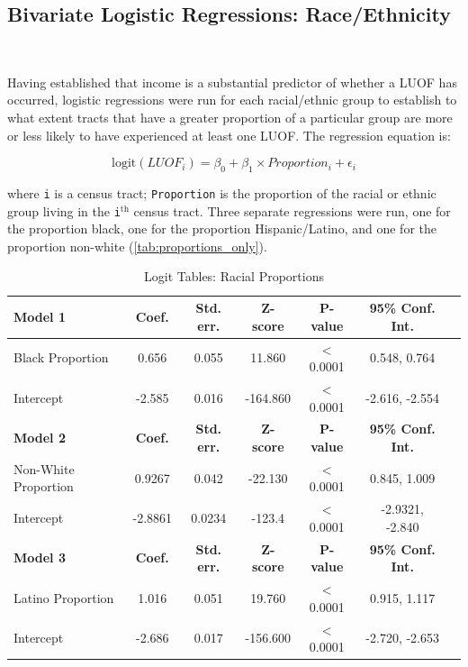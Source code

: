 \documentclass[12pt]{article}
\begin{document}
\subsection{Bivariate Logistic Regressions: Race/Ethnicity}\

Having established that income is a substantial predictor of whether a LUOF has occurred, logistic regressions were run for each racial/ethnic group to establish to what extent tracts that have a greater proportion of a particular group are more or less likely to have experienced at least one LUOF. The regression equation is:

\begin{equation}
\text{logit}(LUOF_{i})=\beta_{0} + \beta_{1} \times Proportion_{i} + \epsilon_{i}
\end{equation}

\noindent{}where \texttt{i} is a census tract; \texttt{Proportion} is the proportion of the racial or ethnic group living in the \texttt{i}$^\text{th}$ census tract. Three separate regressions were run, one for the proportion black, one for the proportion Hispanic/Latino, and one for the proportion non-white (\autoref{tab:proportions_only}).

\begin{table}[ht]
\centering
\begin{tabular}{lcccccc}
\toprule
\textbf{Model 1} & \textbf{Coef.} & \textbf{Std. err.} & \textbf{Z-score} & \textbf{P-value} & \textbf{95\% Conf. Int.} \\
\midrule
Black Proportion & 0.656 & 0.055 & 11.860 & $<$0.0001 & 0.548, 0.764 \\
Intercept & -2.585 & 0.016 & -164.860 & $<$0.0001 & -2.616, -2.554 \\
\midrule
\textbf{Model 2} & \textbf{Coef.} & \textbf{Std. err.} & \textbf{Z-score} & \textbf{P-value} & \textbf{95\% Conf. Int.} \\
\midrule
Non-White Proportion & 0.9267 & 0.042 & -22.130 & $<$0.0001 & 0.845, 1.009 \\
Intercept & -2.8861 & 0.0234 & -123.4 & $<$0.0001 & -2.9321, -2.840 \\
\midrule
\textbf{Model 3} & \textbf{Coef.} & \textbf{Std. err.} & \textbf{Z-score} & \textbf{P-value} & \textbf{95\% Conf. Int.} \\
\midrule
Latino Proportion & 1.016 & 0.051 & 19.760 & $<$0.0001 & 0.915, 1.117 \\
Intercept & -2.686 & 0.017 & -156.600 & $<$0.0001 & -2.720, -2.653 \\
\bottomrule
\end{tabular}
\caption{Logit Tables: Racial Proportions}
\label{tab:proportions_only}
\end{table}
\end{document}
